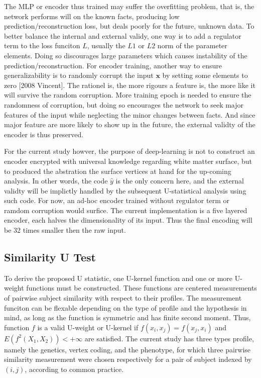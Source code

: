 \documentclass[twocolumn]{article}
\begin{document}
The MLP or encoder thus trained may suffer the overfitting problem, that is, the network performs will on the known facts, producing low prediction/reconstruction loss, but deals poorly for the future, unknown data. To better balance the internal and external validy, one way is to add a regulator term to the loss funciton $L$, usually the $L1$ or $L2$ norm of the parameter elements. Doing so discourages large parameters which causes instability of the prediction/reconstruction. For encoder training, another way to ensure generalizability is to randomly corrupt the input $\boldsymbol{x}$ by setting some elements to zero [2008 Vincent]. The rationel is, the more rigours a feature is, the more like it will survive the random corruption. More training epoch is needed to ensure the randomness of corruption, but doing so encourages the network to seek major features of the input while neglecting the minor changes between facts. And since major feature are more likely to show up in the future, the external validty of the encoder is thus preserved.

For the current study howver, the purpose of deep-learning is not to construct an encoder encrypted with universal knowledge regarding white matter surface, but to produced the abstration the surface vertices at hand for the up-coming analysis. In other words, the code $\hat{y}$ is the only concern here, and the external validty will be implictly handled by the subsequent U-statistical analysis using such code. For now, an ad-hoc encoder trained without regulator term or ramdom corruption would surfice. The current implementation is a five layered encoder, each halves the dimensionality of its input. Thus the final encoding will be 32 times smaller then the raw input.

\subsection{Similarity U Test}
  To derive the proposed U statistic, one U-kernel function and one or more U-weight functions must be constructed. These functions are centered measurements of pairwise subject similarity with respect to their profiles. The measurement funciton can be flexable depending on the type of profile and the hypothesis in mind, as long as the function is symmetric and has finite second moment. Thus, function $f$ is a valid U-weight or U-kernel if $f(x_i,x_j)=f(x_j,x_i)$ and $E(f^2(X_1, X_2))<+\infty$ are satisfied. The current study has three types profile, namely the genetics, vertex coding, and the phenotype, for which three pairwise similarity measurement were chosen respectively for a pair of subject indexed by $(i,j)$, according to common practice.
\end{document}
